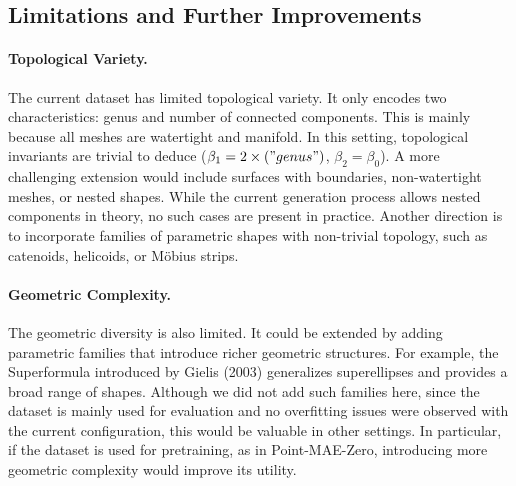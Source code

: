 





\subsection{Limitations and Further Improvements}

\paragraph{Topological Variety.} 
The current dataset has limited topological variety. It only encodes two characteristics: genus and number of connected components. This is mainly because all meshes are watertight and manifold. In this setting, topological invariants are trivial to deduce ($\beta_1= 2 \times \text("genus")$, $\beta_2=\beta_0$). A more challenging extension would include surfaces with boundaries, non-watertight meshes, or nested shapes. While the current generation process allows nested components in theory, no such cases are present in practice. Another direction is to incorporate families of parametric shapes with non-trivial topology, such as catenoids, helicoids, or Möbius strips.


\paragraph{Geometric Complexity.} The geometric diversity is also limited. It could be extended by adding parametric families that introduce richer geometric structures. For example, the Superformula introduced by Gielis (2003) \cite{superformula} generalizes superellipses and provides a broad range of shapes. Although we did not add such families here, since the dataset is mainly used for evaluation and no overfitting issues were observed with the current configuration, this would be valuable in other settings. In particular, if the dataset is used for pretraining, as in Point-MAE-Zero, introducing more geometric complexity would improve its utility.